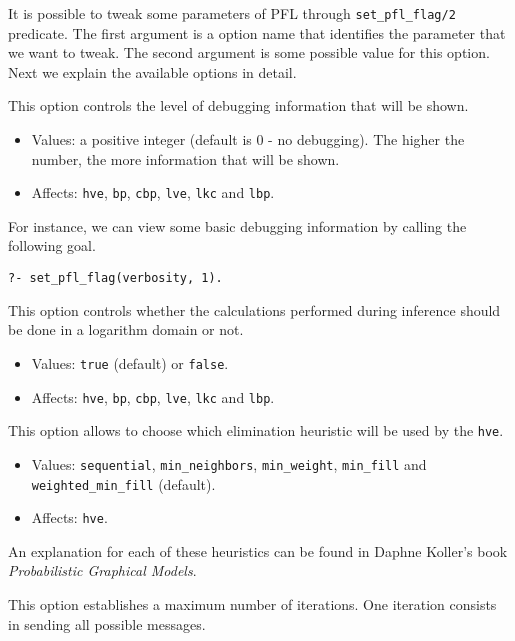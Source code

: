 \documentclass{article}
\begin{document}
It is possible to tweak some parameters of PFL through \texttt{set\_pfl\_flag/2} predicate. The first argument is a option name that identifies the parameter that we want to tweak. The second argument is some possible value for this option. Next we explain the available options in detail.

This option controls the level of debugging information that will be shown.

\begin{itemize}
  \item Values: a positive integer (default is 0 - no debugging). The higher the number, the more information that will be shown.
  \item Affects: \texttt{hve}, \texttt{bp}, \texttt{cbp}, \texttt{lve}, \texttt{lkc} and \texttt{lbp}.
\end{itemize}

For instance, we can view some basic debugging information by calling the following goal.

\texttt{?- set\_pfl\_flag(verbosity, 1).}


This option controls whether the calculations performed during inference should be done in a logarithm domain or not.
\begin{itemize}
  \item Values: \texttt{true} (default) or \texttt{false}.
  \item Affects: \texttt{hve}, \texttt{bp}, \texttt{cbp}, \texttt{lve}, \texttt{lkc} and \texttt{lbp}.
\end{itemize}


This option allows to choose which elimination heuristic will be used by the \texttt{hve}.
\begin{itemize}
  \item Values: \texttt{sequential}, \texttt{min\_neighbors}, \texttt{min\_weight}, \texttt{min\_fill} and\\ \texttt{weighted\_min\_fill} (default).
  \item Affects: \texttt{hve}.
\end{itemize}

An explanation for each of these heuristics can be found in Daphne Koller's book \textit{Probabilistic Graphical Models}.


This option establishes a maximum number of iterations. One iteration consists in sending all possible messages.
\end{document}
